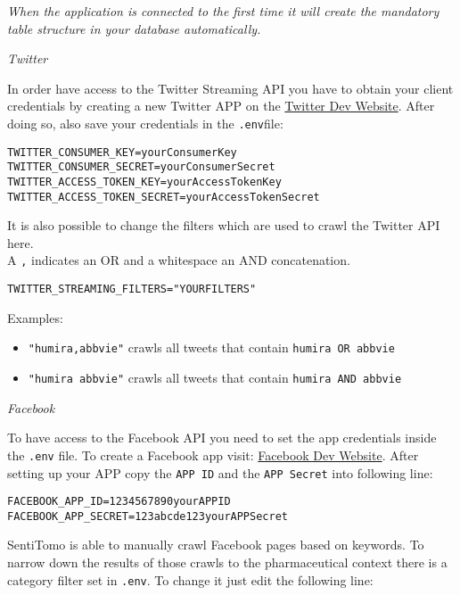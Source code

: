 \documentclass[]{article}
\providecommand{\tightlist}{%
  \setlength{\itemsep}{0pt}\setlength{\parskip}{0pt}}
\begin{document}
\emph{When the application is connected to the first time it will create
the mandatory table structure in your database automatically.}

\emph{Twitter}

In order have access to the Twitter Streaming API you have to obtain
your client credentials by creating a new Twitter APP on the
\href{https://apps.twitter.com/app/new}{Twitter Dev Website}. After
doing so, also save your credentials in the \texttt{.env}file:

\begin{verbatim}
TWITTER_CONSUMER_KEY=yourConsumerKey
TWITTER_CONSUMER_SECRET=yourConsumerSecret
TWITTER_ACCESS_TOKEN_KEY=yourAccessTokenKey
TWITTER_ACCESS_TOKEN_SECRET=yourAccessTokenSecret
\end{verbatim}

It is also possible to change the filters which are used to crawl the
Twitter API here.\\
A \texttt{,} indicates an OR and a whitespace an AND concatenation.

\begin{verbatim}
TWITTER_STREAMING_FILTERS="YOURFILTERS"
\end{verbatim}

Examples:

\begin{itemize}
\tightlist
\item
  \texttt{"humira,abbvie"} crawls all tweets that contain
  \texttt{humira\ OR\ abbvie}
\item
  \texttt{"humira\ abbvie"} crawls all tweets that contain
  \texttt{humira\ AND\ abbvie}
\end{itemize}

\emph{Facebook}

To have access to the Facebook API you need to set the app credentials
inside the \texttt{.env} file. To create a Facebook app visit:
\href{https://developers.facebook.com/apps/}{Facebook Dev Website}.
After setting up your APP copy the \texttt{APP\ ID} and the
\texttt{APP\ Secret} into following line:

\begin{verbatim}
FACEBOOK_APP_ID=1234567890yourAPPID
FACEBOOK_APP_SECRET=123abcde123yourAPPSecret
\end{verbatim}

SentiTomo is able to manually crawl Facebook pages based on keywords. To
narrow down the results of those crawls to the pharmaceutical context
there is a category filter set in \texttt{.env}. To change it just edit
the following line:
\end{document}
